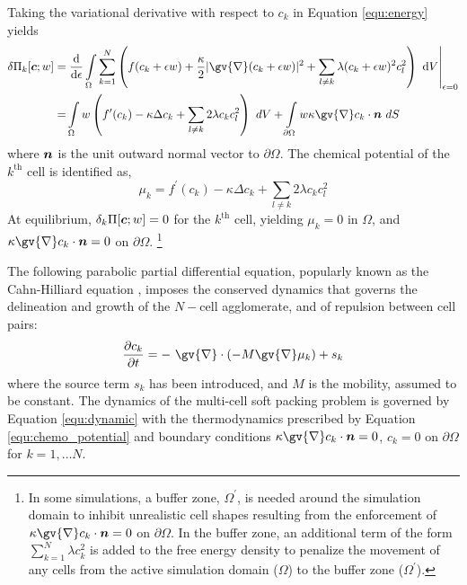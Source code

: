 \documentclass{article}
\newcommand{\grad}[1]{\gv{\nabla} #1}
\def\bc{\mbox{\boldmath$ c$}}
\def\bn{\mbox{\boldmath$ n$}}
\begin{document}
Taking the variational derivative with respect to $c_k$ in Equation \eqref{equ:energy} yields
\begin{align}
\delta \Pi_k[\bc;w] =  & \left.\frac{\text{d}}{\text{d}\epsilon} \int\limits_{\Omega} \sum_{k=1}^{N} \left(f(c_k+\epsilon w) + \frac{\kappa}{2}\vert\grad (c_k+\epsilon w)\vert^2+ \sum_{l\ne k}\lambda (c_k+\epsilon w)^2 c_l^2\right)  ~\text{d}V \right|_{\epsilon=0} \nonumber\\
=&\int\limits_{\Omega} w \left( f^\prime(c_k) -  \kappa \Delta  c_k  + \sum_{l\ne k}2\lambda  c_k c_l^2 \right) ~dV + \int\limits_{\partial \Omega}   w \kappa \grad c_k \cdot \bn   ~dS
\end{align} 
where $\bn$ is the unit outward normal vector to $\partial \Omega$. The chemical potential of the $k^\text{th}$ cell is identified as,
\begin{equation}
\mu_k  = f^\prime(c_k) -  \kappa \Delta c_k + \sum_{l\ne k}2\lambda  c_k c_l^2
\label{equ:chemo_potential}
\end{equation}
At equilibrium, $\delta_k \Pi[\bc;w] =0$ for the $k^\text{th}$ cell, yielding $\mu_k = 0$ in $\Omega$, and $\kappa \grad c_k \cdot \bn = 0$ on $\partial \Omega$. \footnote{In some simulations, a buffer zone, $\Omega^'$, is needed around the simulation domain to inhibit unrealistic cell shapes resulting from the enforcement of $\kappa \grad c_k \cdot \bn = 0$ on $\partial \Omega$. In the buffer zone, an additional term of the form $\sum_{k=1}^{N}\lambda c_k^2$ is added to the free energy density to penalize the movement of any cells from the active simulation domain ($\Omega$) to the buffer zone ($\Omega^'$).} 

The following parabolic partial differential equation, popularly known as the Cahn-Hilliard equation \cite{Cahn1958}, imposes the conserved dynamics that governs the delineation and growth of the $N-$cell agglomerate, and of repulsion between cell pairs:
\begin{equation}
\frac{\partial c_k}{\partial t} = -~\grad \cdot (-M\grad \mu_k) + s_k
\label{equ:dynamic}
\end{equation}
where the source term $s_k$ has been introduced, and $M$ is the mobility, assumed to be constant. The dynamics of the multi-cell soft packing problem is governed by Equation \eqref{equ:dynamic} with the thermodynamics prescribed by Equation \eqref{equ:chemo_potential} and boundary conditions $\kappa \grad c_k \cdot \bn = 0$, $c_k=0$ on $\partial\Omega$ for $k = 1,\dots N$.
\end{document}
